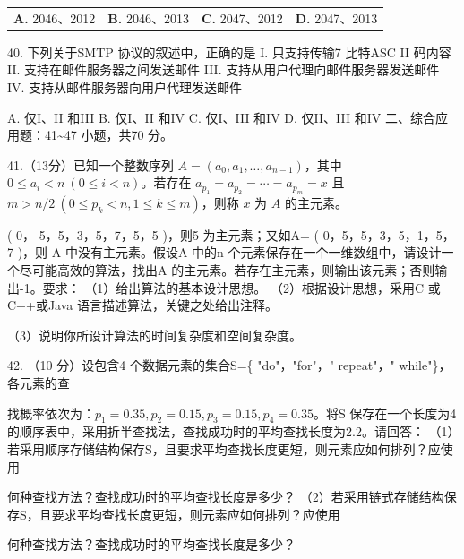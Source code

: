 \documentclass[UTF8,11pt]{ctexart}
\begin{document}
\begin{center}\begin{tabular}{>{\raggedright\arraybackslash}p{\dimexpr(\linewidth-8\tabcolsep)/4\relax}>{\raggedright\arraybackslash}p{\dimexpr(\linewidth-8\tabcolsep)/4\relax}>{\raggedright\arraybackslash}p{\dimexpr(\linewidth-8\tabcolsep)/4\relax}>{\raggedright\arraybackslash}p{\dimexpr(\linewidth-8\tabcolsep)/4\relax}}
\textbf{A.} 2046、2012 & \textbf{B.} 2046、2013 & \textbf{C.} 2047、2012 & \textbf{D.} 2047、2013\\[.35em]\end{tabular}\end{center}

40. 下列关于SMTP 协议的叙述中，正确的是 I. 只支持传输7 比特ASC II 码内容 II. 支持在邮件服务器之间发送邮件 III. 支持从用户代理向邮件服务器发送邮件 IV. 支持从邮件服务器向用户代理发送邮件


A. 仅I、II 和III B. 仅I、II 和IV C. 仅I、III 和IV D. 仅II、III 和IV 二、综合应用题：41\textasciitilde{}47 小题，共70 分。


41.（13分）已知一个整数序列 \(\displaystyle A=(a_0,\allowbreak a_1,\allowbreak \ldots,\allowbreak a_{n-1})\)，其中 \(\displaystyle 0\le a_i<n\ (0\le i<n)\)。若存在 \(\displaystyle a_{p_1}=a_{p_2}=\cdots=a_{p_m}=x\) 且 \(\displaystyle m>n/2\ (0\le p_k<n,\allowbreak 1\le k\le m)\)，则称 \(\displaystyle x\) 为 \(\displaystyle A\) 的主元素。


( 0， 5，5，3，5，7，5，5 )，则5 为主元素；又如A= ( 0，5，5，3，5，1，5，7 )，则 A 中没有主元素。假设A 中的n 个元素保存在一个一维数组中，请设计一个尽可能高效的算法，找出A 的主元素。若存在主元素，则输出该元素；否则输出-1。要求： （1）给出算法的基本设计思想。 （2）根据设计思想，采用C 或C++或Java 语言描述算法，关键之处给出注释。


（3）说明你所设计算法的时间复杂度和空间复杂度。


42. （10 分）设包含4 个数据元素的集合S=\{ "do"，"for"，" repeat"，" while"\}，各元素的查


找概率依次为：\(\displaystyle p_1=0.35,\allowbreak p_2=0.15,\allowbreak p_3=0.15,\allowbreak p_4=0.35\)。将S 保存在一个长度为4 的顺序表中，采用折半查找法，查找成功时的平均查找长度为2.2。请回答： （1）若采用顺序存储结构保存S，且要求平均查找长度更短，则元素应如何排列？应使用


何种查找方法？查找成功时的平均查找长度是多少？ （2）若采用链式存储结构保存S，且要求平均查找长度更短，则元素应如何排列？应使用


何种查找方法？查找成功时的平均查找长度是多少？
\end{document}

